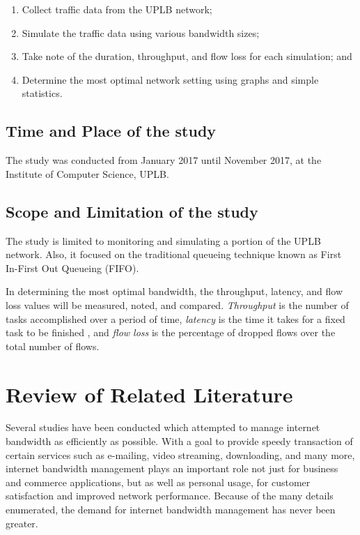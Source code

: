 \documentclass[journal]{IEEE/IEEEtran}
\begin{document}
\begin{enumerate}
\item Collect traffic data from the UPLB network;
\item Simulate the traffic data using various bandwidth sizes;
\item Take note of the duration, throughput, and flow loss for each simulation; and
\item Determine the most optimal network setting using graphs and simple statistics.
\end{enumerate}

\clearpage

\subsection{Time and Place of the study}
The study was conducted from January 2017 until November 2017, at the Institute of Computer Science, UPLB.

\subsection{Scope and Limitation of the study}
The study is limited to monitoring and simulating a portion of the UPLB network. Also, it focused on the traditional queueing technique known as First In-First Out Queueing (FIFO).

In determining the most optimal bandwidth, the throughput, latency, and flow loss values will be measured, noted, and compared. \textit{Throughput} is the number of tasks accomplished over a period of time, \textit{latency} is the time it takes for a fixed task to be finished \cite{martin_roth_nd}, and \textit{flow loss} is the percentage of dropped flows over the total number of flows.

\section{Review of Related Literature}
Several studies have been conducted which attempted to manage internet bandwidth as efficiently as possible. With a goal to provide speedy transaction of certain services such as e-mailing, video streaming, downloading, and many more, internet bandwidth management plays an important role not just for business and commerce applications, but as well as personal usage, for customer satisfaction and improved network performance. Because of the many details enumerated, the demand for internet bandwidth management has never been greater.
\end{document}
